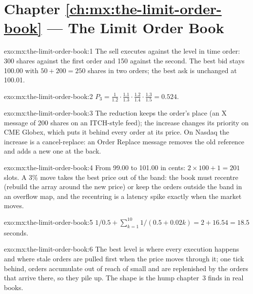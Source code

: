 \section*{Chapter \ref{ch:mx:the-limit-order-book} --- The Limit Order Book}

\begin{solution}{exo:mx:the-limit-order-book:1}
The sell executes against the level in time order: 300 shares against the first order and 150 against the second. The best bid stays 100.00 with
$50+200=250$ shares in two orders; the best ask is unchanged at 100.01.
\end{solution}

\begin{solution}{exo:mx:the-limit-order-book:2}
$P_3=\tfrac{1}{1.2}\cdot\tfrac{1.1}{1.3}\cdot\tfrac{1.2}{1.4}\cdot\tfrac{1.3}{1.5}=0.524$.
\end{solution}

\begin{solution}{exo:mx:the-limit-order-book:3}
The reduction keeps the order's place (an X message of 200 shares on an ITCH-style feed); the increase changes its priority on CME Globex, which puts
it behind every order at its price. On Nasdaq the increase is a cancel-replace: an Order Replace message removes the old reference and adds a new
one at the back.
\end{solution}

\begin{solution}{exo:mx:the-limit-order-book:4}
From 99.00 to 101.00 in cents: $2\times100+1=201$ slots. A 3\% move takes the best price out of the band: the book must recentre (rebuild the array
around the new price) or keep the orders outside the band in an overflow map, and the recentring is a latency spike exactly when the market moves.
\end{solution}

\begin{solution}{exo:mx:the-limit-order-book:5}
$1/0.5+\sum_{k=1}^{10}1/(0.5+0.02k)=2+16.54=18.5$ seconds.
\end{solution}

\begin{solution}{exo:mx:the-limit-order-book:6}
The best level is where every execution happens and where stale orders are pulled first when the price moves through it; one tick behind, orders
accumulate out of reach of small  and are replenished by the orders that arrive there, so they pile up. The shape is the hump
chapter~3 finds in real books.
\end{solution}

